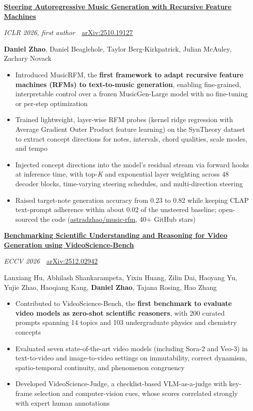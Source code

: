 \documentclass[letterpaper,11pt]{article}
\newcommand{\paper}[4]{%
  \needspace{6\baselineskip}%
  \textbf{\href{https://arxiv.org/abs/#2}{#1}}\par
  \textit{#3}\ \textbar\ \href{https://arxiv.org/abs/#2}{arXiv:#2}\par
  {\small #4\par}}
\newenvironment{bullets}
  {\begin{itemize}[leftmargin=1.2em, label=\textbullet, itemsep=0.5pt, parsep=0pt, topsep=2pt]}
  {\end{itemize}\vspace{5pt}}
\begin{document}
\paper{Steering Autoregressive Music Generation with Recursive Feature Machines}{2510.19127}
  {ICLR 2026, first author}
  {\textbf{Daniel Zhao}, Daniel Beaglehole, Taylor Berg-Kirkpatrick, Julian McAuley, Zachary Novack}
\begin{bullets}
  \item Introduced MusicRFM, the \textbf{first framework to adapt recursive feature machines (RFMs) to text-to-music generation}, enabling fine-grained, interpretable control over a frozen MusicGen-Large model with no fine-tuning or per-step optimization
  \item Trained lightweight, layer-wise RFM probes (kernel ridge regression with Average Gradient Outer Product feature learning) on the SynTheory dataset to extract concept directions for notes, intervals, chord qualities, scale modes, and tempo
  \item Injected concept directions into the model's residual stream via forward hooks at inference time, with top-\textit{K} and exponential layer weighting across 48 decoder blocks, time-varying steering schedules, and multi-direction steering
  \item Raised target-note generation accuracy from 0.23 to 0.82 while keeping CLAP text-prompt adherence within about 0.02 of the unsteered baseline; open-sourced the code (\href{https://github.com/astradzhao/music-rfm}{astradzhao/music-rfm}, 40+ GitHub stars)
\end{bullets}

\paper{Benchmarking Scientific Understanding and Reasoning for Video Generation using VideoScience-Bench}{2512.02942}
  {ECCV 2026}
  {Lanxiang Hu, Abhilash Shankarampeta, Yixin Huang, Zilin Dai, Haoyang Yu, Yujie Zhao, Haoqiang Kang, \textbf{Daniel Zhao}, Tajana Rosing, Hao Zhang}
\begin{bullets}
  \item Contributed to VideoScience-Bench, the \textbf{first benchmark to evaluate video models as zero-shot scientific reasoners}, with 200 curated prompts spanning 14 topics and 103 undergraduate physics and chemistry concepts
  \item Evaluated seven state-of-the-art video models (including Sora-2 and Veo-3) in text-to-video and image-to-video settings on immutability, correct dynamism, spatio-temporal continuity, and phenomenon congruency
  \item Developed VideoScience-Judge, a checklist-based VLM-as-a-judge with key-frame selection and computer-vision cues, whose scores correlated strongly with expert human annotations
\end{bullets}
\end{document}
